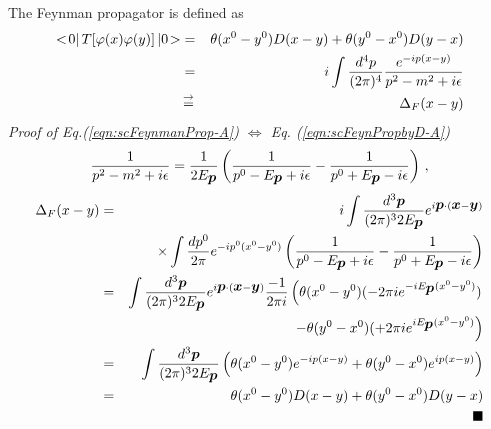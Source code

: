 The Feynman propagator is defined as
\begin{eqnarray}
<\! 0 |\, T[\varphi(x) \varphi(y)] \,| 0 \!>
&=&
\theta(x^0 - y^0) D(x-y)
+
\theta(y^0 - x^0) D(y-x)
\label{eqn:scFeynPropbyD-A}
\\
&=&
i \int \frac{d^4 p}{(2\pi)^4}
\frac{e^{-ip (x-y)}}{p^2 - m^2 + i\epsilon}
\label{eqn:scFeynmanProp-A}
\\
&\,\mbox{$\stackrel{\rightarrow}{=}$}\,&
\Delta_F(x-y)
\nonumber
\end{eqnarray}
{\it Proof of Eq.(\ref{eqn:scFeynmanProp-A}) $\Leftrightarrow$ Eq. (\ref{eqn:scFeynPropbyD-A})}\\
\begin{eqnarray}
\frac{1}{p^2 - m^2 + i\epsilon}
=
\frac{1}{2 E_{\mbox{\boldmath $p$}}} \left(
\frac{1}{p^0 - E_{\mbox{\boldmath $p$}} + i\epsilon}
-
\frac{1}{p^0 + E_{\mbox{\boldmath $p$}} - i\epsilon}
\right)
\,,
\end{eqnarray}
\begin{eqnarray}
\Delta_F(x-y)
&=&
i \int \frac{d^3 \bld{p}}{(2\pi)^3 2 E_{\bld{p}}} e^{i\bld{p}\cdot (\bld{x} - \bld{y})}
\nonumber\\
&&
\times \int \frac{d p^0}{2\pi} e^{- ip^0 (x^0 - y^0)}
\left(
\frac{1}{p^0 - E_{\bld{p}} + i\epsilon}
-
\frac{1}{p^0 + E_{\bld{p}} - i\epsilon}
\right)
\nonumber\\
&=&
\int \frac{d^3 \bld{p}}{(2\pi)^3 2 E_{\bld{p}}} e^{i\bld{p}\cdot (\bld{x} - \bld{y})}
\frac{-1}{2\pi i} \left(
\theta(x^0 - y^0) (-2\pi i e^{-i E_{\bld{p}}(x^0 - y^0)})
\right.
\nonumber\\
&&
\left.
-
\theta(y^0 - x^0) (+2\pi i e^{i E_{\bld{p}}(x^0 - y^0)}
\right)
\nonumber\\
&=&
\int \frac{d^3 \bld{p}}{(2\pi)^3 2 E_{\bld{p}}} 
\left(
\theta(x^0 - y^0) e^{-ip(x-y)}
+
\theta(y^0 - x^0) e^{i p(x-y)}
\right)
\nonumber\\
&=&
\theta(x^0 - y^0) D(x-y)
+
\theta(y^0 - x^0) D(y-x)
\nonumber\\
&& 
\hspace{65mm}
\blacksquare
\end{eqnarray}


